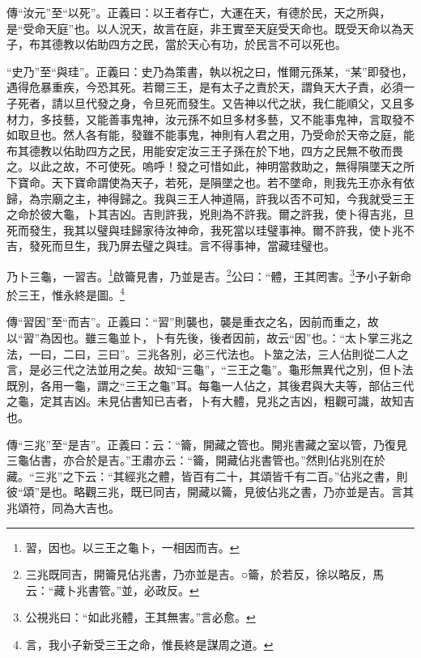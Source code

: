 {\noindent\zhuan{}\fzbyks 傳“汝元”至“以死”。正義曰：以王者存亡，大運在天，有德於民，天之所與，是“受命天庭”也。以人況天，故言在庭，非王實至天庭受天命也。既受天命以為天子，布其德教以佑助四方之民，當於天心有功，於民言不可以死也。 \par}

{\noindent\shu{}\fzkt “史乃”至“與珪”。正義曰：史乃為策書，執以祝之曰，惟爾元孫某，“某”即發也，遇得危暴重疾，今恐其死。若爾三王，是有太子之責於天，謂負天大子責，必須一子死者，請以旦代發之身，令旦死而發生。又告神以代之狀，我仁能順父，又且多材力，多技藝，又能善事鬼神，汝元孫不如旦多材多藝，又不能事鬼神，言取發不如取旦也。然人各有能，發雖不能事鬼，神則有人君之用，乃受命於天帝之庭，能布其德教以佑助四方之民，用能安定汝三王子孫在於下地，四方之民無不敬而畏之。以此之故，不可使死。嗚呼！發之可惜如此，神明當救助之，無得隕墜天之所下寶命。天下寶命謂使為天子，若死，是隕墜之也。若不墜命，則我先王亦永有依歸，為宗廟之主，神得歸之。我與三王人神道隔，許我以否不可知，今我就受三王之命於彼大龜，卜其吉凶。吉則許我，兇則為不許我。爾之許我，使卜得吉兆，旦死而發生，我其以璧與珪歸家待汝神命，我死當以珪璧事神。爾不許我，使卜兆不吉，發死而旦生，我乃屏去璧之與珪。言不得事神，當藏珪璧也。 \par}

乃卜三龜，一習吉。\footnote{習，因也。以三王之龜卜，一相因而吉。}啟籥見書，乃並是吉。\footnote{三兆既同吉，開籥見佔兆書，乃亦並是吉。○籥，於若反，徐以略反，馬云：“藏卜兆書管。”並，必政反。}公曰：“體，王其罔害。\footnote{公視兆曰：“如此兆體，王其無害。”言必愈。}予小子新命於三王，惟永終是圖。\footnote{言，我小子新受三王之命，惟長終是謀周之道。}


{\noindent\zhuan{}\fzbyks 傳“習因”至“而吉”。正義曰：“習”則襲也，襲是重衣之名，因前而重之，故以“習”為因也。雖三龜並卜，卜有先後，後者因前，故云“因”也。：“太卜掌三兆之法，一曰，二曰，三曰”。三兆各別，必三代法也。卜筮之法，三人佔則從二人之言，是必三代之法並用之矣。故知“三龜”，“三王之龜”。龜形無異代之別，但卜法既別，各用一龜，謂之“三王之龜”耳。每龜一人佔之，其後君與大夫等，部佔三代之龜，定其吉凶。未見佔書知已吉者，卜有大體，見兆之吉凶，粗觀可識，故知吉也。 \par}

{\noindent\zhuan{}\fzbyks 傳“三兆”至“是吉”。正義曰：云：“籥，開藏之管也。開兆書藏之室以管，乃復見三龜佔書，亦合於是吉。”王肅亦云：“籥，開藏佔兆書管也。”然則佔兆別在於藏。“三兆”之下云：“其經兆之體，皆百有二十，其頌皆千有二百。”佔兆之書，則彼“頌”是也。略觀三兆，既已同吉，開藏以籥，見彼佔兆之書，乃亦並是吉。言其兆頌符，同為大吉也。 \par}

